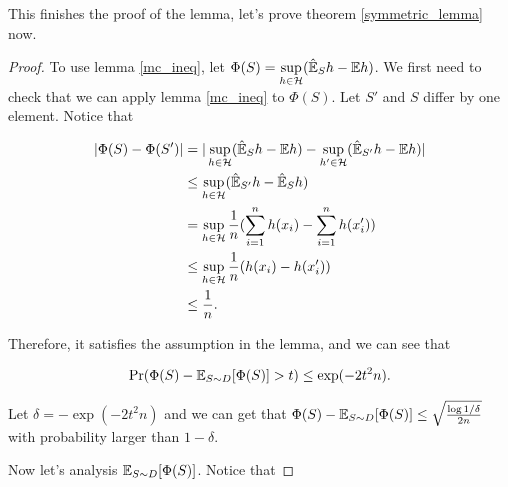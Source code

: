 \documentclass[../main.tex]{subfiles}
\begin{document}
	This finishes the proof of the lemma, let's prove theorem \ref{symmetric_lemma} now.
	
	\begin{proof}
		To use lemma \ref{mc_ineq}, let $\Phi(S) = \sup\limits_{h\in \mathcal{H}} (\hat{\mathbb{E}}_S h - \mathbb{E} h )$. We first need to check that we can apply lemma \ref{mc_ineq} to $\Phi(S)$. Let $S'$ and $S$ differ by one element. Notice that 
		
		\begin{equation*}
			\begin{aligned}
				|\Phi(S) - \Phi(S')| & = |\sup\limits_{h\in \mathcal{H}} (\hat{\mathbb{E}}_S h - \mathbb{E} h ) - \sup\limits_{h'\in \mathcal{H}} (\hat{\mathbb{E}}_{S'} h - \mathbb{E} h )| \\
									& \leq \sup\limits_{h\in \mathcal{H}} (\hat{\mathbb{E}}_{S'} h - \hat{\mathbb{E}}_S h) \\
									& = \sup\limits_{h\in \mathcal{H}} \frac{1}{n} (\sum\limits_{i=1}^n h(x_i) - \sum\limits_{i=1}^n h(x'_i) ) \\
									& \leq \sup\limits_{h\in \mathcal{H}} \frac{1}{n} (h(x_i) - h(x_i')) \\
									& \leq \frac{1}{n}.
			\end{aligned}
		\end{equation*}
		
		Therefore, it satisfies the assumption in the lemma, and we can see that 
		
		\begin{equation*}
			\begin{aligned}
				\Pr(\Phi(S) - \mathbb{E}_{S \sim D}[\Phi(S)] > t ) \leq \exp(-2t^2n).
			\end{aligned}
		\end{equation*}
		
		Let $\delta = -\exp(-2t^2 n)$ and we can get that $\Phi(S) - \mathbb{E}_{S \sim D}[\Phi(S)] \leq \sqrt{\frac{\log 1 / \delta}{2n}}$ with probability larger than $1-\delta$.
		
		Now let's analysis $\mathbb{E}_{S \sim D}[\Phi(S)]$. Notice that
		

\end{proof}
\end{document}
